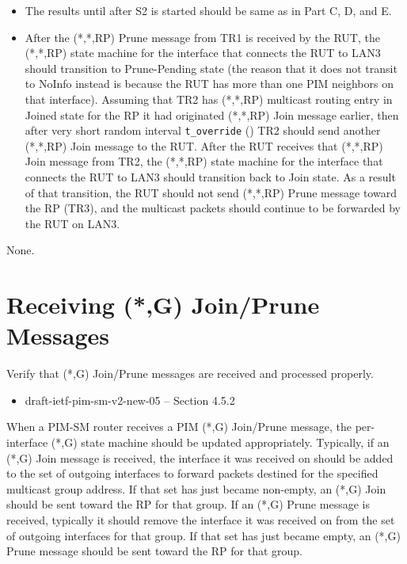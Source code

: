 \documentclass[11pt]{report}
\begin{document}
\begin{itemize}

  \item The results until after S2 is started should be same as in
  Part C, D, and E.

  \item After the (*,*,RP) Prune message from TR1 is received by the RUT,
  the (*,*,RP) state machine for the interface that connects the RUT to
  LAN3 should transition to Prune-Pending state (the reason that it does
  not transit to NoInfo instead is because the RUT has more than one PIM
  neighbors on that interface).
  Assuming that TR2 has (*,*,RP) multicast routing entry in Joined state
  for the RP it had originated (*,*,RP) Join message earlier, then after
  very short random interval \verb=t_override= ({\PimsmTOverride}) TR2
  should send another (*,*,RP) Join message to the RUT.
  After the RUT receives that (*,*,RP) Join message from TR2,
  the (*,*,RP) state machine for the interface that connects the RUT to
  LAN3 should transition back to Join state.
  As a result of that transition, the RUT should not send (*,*,RP) Prune
  message toward the RP (TR3), and the multicast packets should continue
  to be forwarded by the RUT on LAN3.

\end{itemize}

None.

\newpage
\section{Receiving (*,G) Join/Prune Messages}

Verify that (*,G) Join/Prune messages are received and processed
properly.

\begin{itemize}
  \item draft-ietf-pim-sm-v2-new-05 -- Section 4.5.2
\end{itemize}

When a PIM-SM router receives a PIM (*,G) Join/Prune message, the
per-interface (*,G) state machine should be updated appropriately.
Typically, if an (*,G) Join message is received, the interface it was
received on should be added to the set of outgoing interfaces to
forward packets destined for the specified multicast group address.
If that set has just became non-empty, an (*,G) Join should be sent
toward the RP for that group.
If an (*,G) Prune message is received, typically it should remove
the interface it was received on from the set of outgoing interfaces
for that group. If
that set has just became empty, an (*,G) Prune message should be
sent toward the RP for that group.
\end{document}
